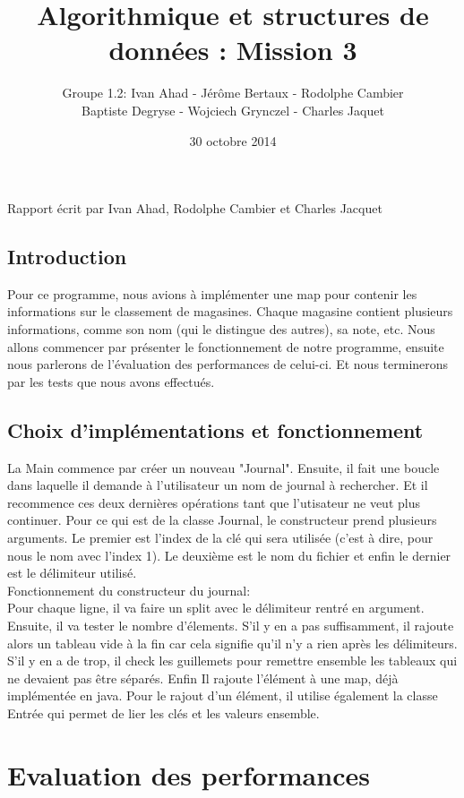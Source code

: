 \documentclass[a4paper]{article}
\title{Algorithmique et structures de données : Mission 3}
\date{30 octobre 2014}
\author{Groupe 1.2: Ivan Ahad - Jérôme Bertaux - Rodolphe Cambier \\ 
	Baptiste Degryse - Wojciech Grynczel - Charles Jaquet}
\begin{document}
\maketitle



Rapport écrit par Ivan Ahad, Rodolphe Cambier et Charles Jacquet

\subsection*{Introduction}
Pour ce programme, nous avions à implémenter une map pour contenir les informations sur le classement de magasines. Chaque magasine contient plusieurs informations, comme son nom (qui le distingue des autres), sa note, etc.
Nous allons commencer par présenter le fonctionnement de notre programme, ensuite nous parlerons de l'évaluation des performances de celui-ci. Et nous terminerons par les tests que nous avons effectués.

\subsection*{Choix d'implémentations et fonctionnement}
La Main commence par créer un nouveau "Journal". Ensuite, il fait une boucle dans laquelle il demande à l'utilisateur un nom de journal à rechercher.
Et il recommence ces deux dernières opérations tant que l'utisateur ne veut plus continuer.
Pour ce qui est de la classe Journal, le constructeur prend plusieurs arguments. Le premier est l'index de la clé qui sera utilisée (c'est à dire, pour nous le nom avec l'index 1). Le deuxième est le nom du fichier et enfin le dernier est le délimiteur utilisé.\\
Fonctionnement du constructeur du journal:\\
Pour chaque ligne, il va faire un split avec le délimiteur rentré en argument. Ensuite, il va tester le nombre d'élements. S'il y en a pas suffisamment,  il rajoute alors un tableau vide à la fin car cela signifie qu'il n'y a rien après les délimiteurs. S'il y en a de trop, il check les guillemets pour remettre ensemble les tableaux qui ne devaient pas être séparés. Enfin Il rajoute l'élément à une map, déjà implémentée en java. Pour le rajout d'un élément, il utilise également la classe Entrée qui permet de lier les clés et les valeurs ensemble.

\section*{Evaluation des performances}
\end{document}
